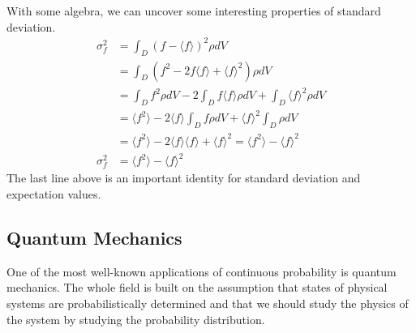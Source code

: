 \documentclass[fleqn,letterpaper]{report}
\begin{document}
With some algebra, we can uncover some interesting properties
of standard deviation.
\begin{align*}
\sigma_f^2 & = \int_D (f - \langle f\rangle)^2 \rho dV \\
& = \int_D (f^2 - 2 f\langle f\rangle + \langle f\rangle^2)\rho dV \\
& = \int_D f^2 \rho dV - 2 \int_D f \langle f\rangle \rho dV +
\int_D \langle f\rangle^2
\rho dV \\
& = \langle f^2\rangle - 2 \langle f\rangle \int_D f \rho dV +
\langle f\rangle^2 \int_D \rho dV \\
& = \langle f^2\rangle - 2 \langle f\rangle \langle f\rangle +
\langle f\rangle^2 = \langle f^2\rangle - \langle f\rangle^2
\\
\sigma_f^2 & = \langle f^2\rangle - \langle f\rangle^2
\end{align*}
The last line above is an important identity for standard
deviation and expectation values.

\subsection{Quantum Mechanics}
\label{quantum}

One of the most well-known applications of continuous
probability is quantum mechanics. The whole field is built on
the assumption that states of physical systems are
probabilistically determined and that we should study the
physics of the system by studying the probability
distribution.
\end{document}
